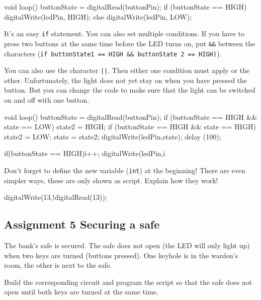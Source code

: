 \documentclass{arduino}
\begin{document}
\begin{marginlisting}
void loop() {
  buttonState = digitalRead(buttonPin);
  if (buttonState == HIGH) {
    digitalWrite(ledPin, HIGH);
  }
  else {
    digitalWrite(ledPin, LOW);
  }
}
\end{marginlisting}

It's an easy \lstinline{if} statement. You can also set multiple conditions. If you have to press two buttons at the same time before the LED turns on, put \lstinline{&&} between the characters (\lstinline{if buttonState1 == HIGH && buttonState 2 == HIGH)}).

You can also use the character \lstinline{||}. Then either one condition must apply or the other. Unfortunately, the light does not yet stay on when you have pressed the button. But you can change the code to make sure that the light can be switched on and off with one button.

\begin{marginlisting}
void loop() {
  buttonState = digitalRead(buttonPin);
  if (buttonState == HIGH && state == LOW) {
    state2 = HIGH;
    }
  if (buttonState == HIGH && state == HIGH) {
    state2 = LOW;
    }
  state = state2;
  digitalWrite(ledPin,state);
  delay (100);
}
\end{marginlisting}

\begin{marginlisting}
if(buttonState == HIGH){i++;}
digitalWrite(ledPin,i%
\end{marginlisting}
Don't forget to define the new variable (\lstinline{int}) at the beginning! There are even simpler ways, these are only shown as script. Explain how they work!

\begin{marginlisting}
digitalWrite(13,!digitalRead(13));
\end{marginlisting}

\newpage

\subsection{Assignment 5 Securing a safe}

The bank's safe is secured. The safe does not open (the LED will only light up) when two keys are turned (buttons pressed). One keyhole is in the warden's room, the other is next to the safe.

Build the corresponding circuit and program the script so that the safe does not open until both keys are turned at the same time.
\end{document}
